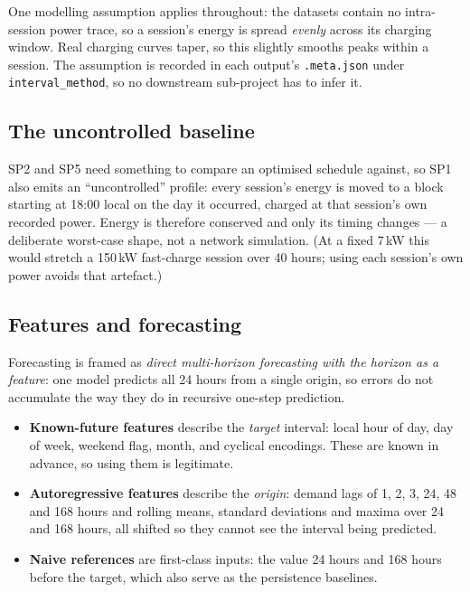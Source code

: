 \documentclass[11pt,a4paper]{article}
\newcommand{\code}[1]{\texttt{\small #1}}
\begin{document}
One modelling assumption applies throughout: the datasets contain no intra-session power trace, so
a session's energy is spread \emph{evenly} across its charging window. Real charging curves taper,
so this slightly smooths peaks within a session. The assumption is recorded in each output's
\code{.meta.json} under \code{interval\_method}, so no downstream sub-project has to infer it.

\subsection{The uncontrolled baseline}

SP2 and SP5 need something to compare an optimised schedule against, so SP1 also emits an
``uncontrolled'' profile: every session's energy is moved to a block starting at 18:00 local
on the day it occurred, charged at that session's own recorded power. Energy is therefore
conserved and only its timing changes — a deliberate worst-case shape, not a network
simulation. (At a fixed 7\,kW this would stretch a 150\,kW fast-charge session over 40 hours;
using each session's own power avoids that artefact.)

\subsection{Features and forecasting}

Forecasting is framed as \emph{direct multi-horizon forecasting with the horizon as a
feature}: one model predicts all 24 hours from a single origin, so errors do not accumulate
the way they do in recursive one-step prediction.

\begin{itemize}
  \item \textbf{Known-future features} describe the \emph{target} interval: local hour of
        day, day of week, weekend flag, month, and cyclical encodings. These are known in
        advance, so using them is legitimate.
  \item \textbf{Autoregressive features} describe the \emph{origin}: demand lags of 1, 2, 3,
        24, 48 and 168 hours and rolling means, standard deviations and maxima over 24 and
        168 hours, all shifted so they cannot see the interval being predicted.
  \item \textbf{Naive references} are first-class inputs: the value 24 hours and 168 hours
        before the target, which also serve as the persistence baselines.
\end{itemize}
\end{document}
